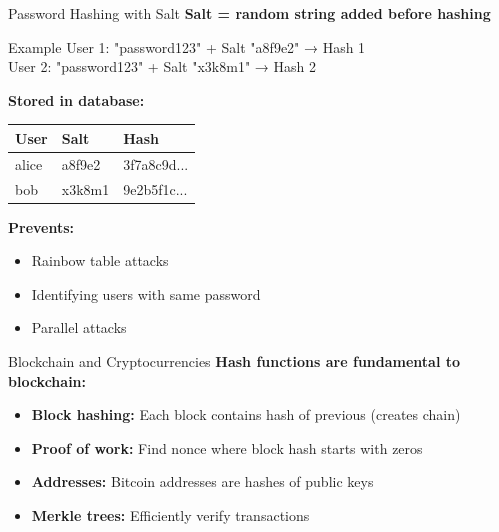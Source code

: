 \documentclass{beamer}
\begin{document}
\begin{frame}[fragile]{Password Hashing with Salt}
\textbf{Salt = random string added before hashing}

\vspace{0.3cm}
\begin{exampleblock}{Example}
User 1: "password123" + Salt "a8f9e2" → Hash 1\\
User 2: "password123" + Salt "x3k8m1" → Hash 2
\end{exampleblock}

\vspace{0.3cm}
\textbf{Stored in database:}
\begin{center}
\begin{tabular}{|l|l|l|}
\hline
\textbf{User} & \textbf{Salt} & \textbf{Hash} \\
\hline
alice & a8f9e2 & 3f7a8c9d... \\
bob & x3k8m1 & 9e2b5f1c... \\
\hline
\end{tabular}
\end{center}

\textbf{Prevents:}
\begin{itemize}
    \item Rainbow table attacks
    \item Identifying users with same password
    \item Parallel attacks
\end{itemize}
\end{frame}

\begin{frame}{Blockchain and Cryptocurrencies}
\textbf{Hash functions are fundamental to blockchain:}

\vspace{0.3cm}
\begin{itemize}
    \item \textbf{Block hashing:} Each block contains hash of previous (creates chain)
    \item \textbf{Proof of work:} Find nonce where block hash starts with zeros
    \item \textbf{Addresses:} Bitcoin addresses are hashes of public keys
    \item \textbf{Merkle trees:} Efficiently verify transactions
\end{itemize}

\end{frame}
\end{document}

